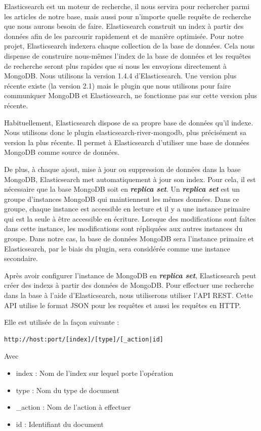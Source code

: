 Elasticsearch est un moteur de recherche, il nous servira pour rechercher parmi les articles de notre base, mais aussi pour n'importe quelle requête de recherche que nous aurons besoin de faire. Elasticsearch construit un index à partir des données afin de les parcourir rapidement et de manière optimisée. Pour notre projet, Elasticsearch indexera chaque collection de la base de données. Cela nous dispense de construire nous-mêmes l'index de la base de données et les requêtes de recherche seront plus rapides que si nous les envoyions directement à MongoDB. Nous utilisons la version 1.4.4 d'Elasticsearch. Une version plus récente existe (la version 2.1) mais le plugin que nous utilisons pour faire communiquer MongoDB et Elasticsearch, ne fonctionne pas sur cette version plus récente.


Habituellement, Elasticsearch dispose de sa propre base de données qu’il indexe. Nous utilisons donc le plugin elasticsearch-river-mongodb\cite{GitRiver}, plus précisément sa version la plus récente. Il permet à Elasticsearch d’utiliser une base de données MongoDB comme source de données. 


De plus, à chaque ajout, mise à jour ou suppression de données dans la base MongoDB, Elasticsearch met automatiquement à jour son index. Pour cela, il est nécessaire que la base MongoDB soit en \textbf{\textit{replica set}}.  Un \textbf{\textit{replica set}} est un groupe d’instances MongoDB qui maintiennent les mêmes données. Dans ce groupe, chaque instance est accessible en lecture et il y a une instance primaire qui est la seule à être accessible en écriture. Lorsque des modifications sont faîtes dans cette instance, les modifications sont répliquées aux autres instances du groupe. Dans notre cas, la base de données MongoDB sera l’instance primaire et Elasticsearch, par le biais du plugin, sera considérée comme une instance secondaire. 

Après avoir configurer l'instance de MongoDB en \textbf{\textit{replica set}}, Elasticsearch peut créer des indexs à partir des données de MongoDB.
Pour effectuer une recherche dans la base à l’aide d’Elasticsearch, nous utiliserons utiliser l’API REST. Cette API utilise le format JSON pour les requêtes et aussi les requêtes en HTTP.


Elle est utilisée de la façon suivante :
\begin{verbatim}
http://host:port/[index]/[type]/[_action|id]
\end{verbatim}
Avec

\begin{itemize}
	\item index : Nom de l’index sur lequel porte l’opération
	\item type : Nom du type de document
	\item \_action : Nom de l’action à effectuer
	\item id : Identifiant du document
\end{itemize}


